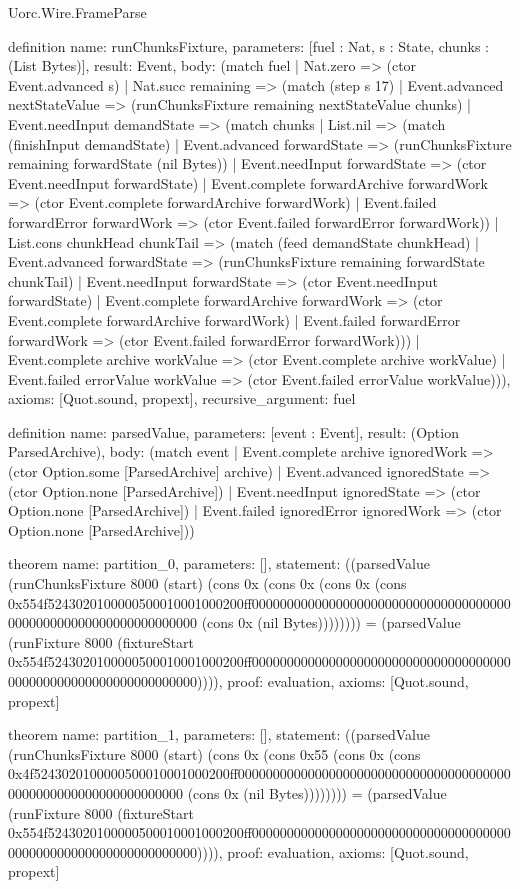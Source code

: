\begin{lexlean}{Uorc.Wire.FrameParse}
\begin{semanticmodule}
definition{
  name: runChunksFixture,
  parameters: [fuel : Nat, s : State, chunks : (List Bytes)],
  result: Event,
  body: (match fuel
    | Nat.zero => (ctor Event.advanced s)
    | Nat.succ remaining => (match (step s 17)
      | Event.advanced nextStateValue => (runChunksFixture remaining nextStateValue chunks)
      | Event.needInput demandState => (match chunks
        | List.nil => (match (finishInput demandState)
          | Event.advanced forwardState => (runChunksFixture remaining forwardState (nil Bytes))
          | Event.needInput forwardState => (ctor Event.needInput forwardState)
          | Event.complete forwardArchive forwardWork => (ctor Event.complete forwardArchive forwardWork)
          | Event.failed forwardError forwardWork => (ctor Event.failed forwardError forwardWork))
        | List.cons chunkHead chunkTail => (match (feed demandState chunkHead)
          | Event.advanced forwardState => (runChunksFixture remaining forwardState chunkTail)
          | Event.needInput forwardState => (ctor Event.needInput forwardState)
          | Event.complete forwardArchive forwardWork => (ctor Event.complete forwardArchive forwardWork)
          | Event.failed forwardError forwardWork => (ctor Event.failed forwardError forwardWork)))
      | Event.complete archive workValue => (ctor Event.complete archive workValue)
      | Event.failed errorValue workValue => (ctor Event.failed errorValue workValue))),
  axioms: [Quot.sound, propext],
  recursive_argument: fuel
}

definition{
  name: parsedValue,
  parameters: [event : Event],
  result: (Option ParsedArchive),
  body: (match event
    | Event.complete archive ignoredWork => (ctor Option.some [ParsedArchive] archive)
    | Event.advanced ignoredState => (ctor Option.none [ParsedArchive])
    | Event.needInput ignoredState => (ctor Option.none [ParsedArchive])
    | Event.failed ignoredError ignoredWork => (ctor Option.none [ParsedArchive]))
}

theorem{
  name: partition_0,
  parameters: [],
  statement: ((parsedValue (runChunksFixture 8000 (start) (cons 0x (cons 0x (cons 0x (cons 0x554f5243020100000500010001000200ff0000000000000000000000000000000000000000000000000000000000000000 (cons 0x (nil Bytes)))))))) = (parsedValue (runFixture 8000 (fixtureStart 0x554f5243020100000500010001000200ff0000000000000000000000000000000000000000000000000000000000000000)))),
  proof: evaluation{},
  axioms: [Quot.sound, propext]
}

theorem{
  name: partition_1,
  parameters: [],
  statement: ((parsedValue (runChunksFixture 8000 (start) (cons 0x (cons 0x55 (cons 0x (cons 0x4f5243020100000500010001000200ff0000000000000000000000000000000000000000000000000000000000000000 (cons 0x (nil Bytes)))))))) = (parsedValue (runFixture 8000 (fixtureStart 0x554f5243020100000500010001000200ff0000000000000000000000000000000000000000000000000000000000000000)))),
  proof: evaluation{},
  axioms: [Quot.sound, propext]
}


\end{semanticmodule}
\end{lexlean}
